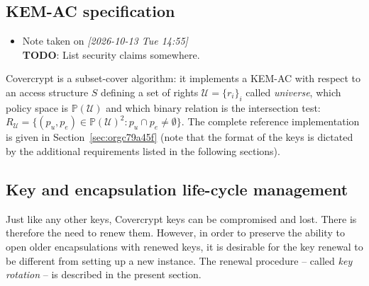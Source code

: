 \documentclass[a4paper]{article}
\theoremstyle{definition}
\newcommand{\powerset}[1]{\mathbb P(#1)}
\newcommand{\cU}{\mathcal{U}}
\begin{document}
\subsection{KEM-AC specification}
\label{sec:org58def2c}

\begin{itemize}
\item Note taken on \textit{{[}2026-10-13 Tue 14:55] } \\
\textbf{TODO}: List security claims somewhere.
\end{itemize}
Covercrypt is a  subset-cover algorithm: it implements a KEM-AC  with respect to
an  access structure  \(S\) defining  a  set of  rights \(\cU  = \{r_i\}_i\)  called
\emph{universe}, which policy space is  \(\powerset{\cU}\) and which binary relation is
the intersection test:  \(R_{\cU} = \{(p_u, p_e) \in \powerset{\cU}^2  : p_u \cap
p_e  \ne \emptyset  \}\).   The  complete reference  implementation  is given  in
Section \ref{sec:orgc79a45f} (note that the format of the keys is
dictated by the additional requirements listed in the following sections).
\subsection{Key and encapsulation life-cycle management}
\label{sec:orgb36d05b}

Just like any other keys, Covercrypt keys  can be compromised and lost. There is
therefore the need to renew them.  However,  in order to preserve the ability to
open older encapsulations with renewed keys, it is desirable for the key renewal
to be different from setting up a  new instance. The renewal procedure -- called
\emph{key rotation} -- is described in the present section.
\end{document}
